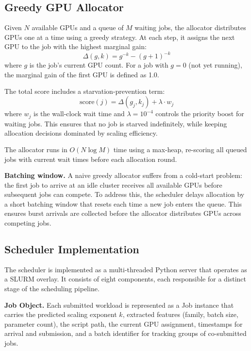 \documentclass[letterpaper,10pt]{article}
\begin{document}
\subsection{Greedy GPU Allocator}

Given $N$ available GPUs and a queue of $M$ waiting jobs, the allocator distributes GPUs one at a time using a greedy strategy. At each step, it assigns the next GPU to the job with the highest marginal gain:
\begin{equation}
    \Delta(g, k) = g^{-k} - (g+1)^{-k}
    \label{eq:marginal}
\end{equation}
where $g$ is the job's current GPU count. For a job with $g = 0$ (not yet running), the marginal gain of the first GPU is defined as 1.0.

The total score includes a starvation-prevention term:
\begin{equation}
    \text{score}(j) = \Delta(g_j, k_j) + \lambda \cdot w_j
\end{equation}
where $w_j$ is the wall-clock wait time and $\lambda = 10^{-4}$ controls the priority boost for waiting jobs. This ensures that no job is starved indefinitely, while keeping allocation decisions dominated by scaling efficiency.

The allocator runs in $O(N \log M)$ time using a max-heap, re-scoring all queued jobs with current wait times before each allocation round.

\textbf{Batching window.} A naive greedy allocator suffers from a cold-start problem: the first job to arrive at an idle cluster receives all available GPUs before subsequent jobs can compete. To address this, the scheduler delays allocation by a short batching window that resets each time a new job enters the queue. This ensures burst arrivals are collected before the allocator distributes GPUs across competing jobs.

\subsection{Scheduler Implementation}

The scheduler is implemented as a multi-threaded Python server that operates as a SLURM overlay. It consists of eight components, each responsible for a distinct stage of the scheduling pipeline.

\textbf{Job Object.} Each submitted workload is represented as a Job instance that carries the predicted scaling exponent $k$, extracted features (family, batch size, parameter count), the script path, the current GPU assignment, timestamps for arrival and submission, and a batch identifier for tracking groups of co-submitted jobs.
\end{document}
